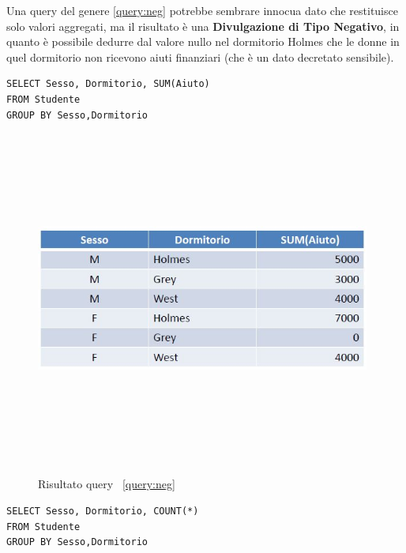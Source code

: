 Una query del genere \ref{query:neg} potrebbe sembrare innocua dato che restituisce solo valori aggregati, ma il risultato è una \textbf{Divulgazione di Tipo Negativo}, in quanto è possibile dedurre dal valore nullo nel dormitorio Holmes che le donne in quel dormitorio non ricevono aiuti finanziari (che è un dato decretato sensibile). 

\begin{algorithm} 
\begin{lstlisting}[caption={Query che implementa un attacco con somma per ottenere Divulgazione di tipo negativo \label{query:neg}}] 
SELECT Sesso, Dormitorio, SUM(Aiuto)
FROM Studente
GROUP BY Sesso,Dormitorio
\end{lstlisting}
\end{algorithm}

\begin{figure}[htbp]
	\centering				
		{\includegraphics[height=11cm, width=11cm, keepaspectratio]{Immagini/dati_sensibili/prot_dati_09.JPG}}
							\caption{Risultato query ~\ref{query:neg} \label{fig:query_indiretta_result}}                         
\end{figure}

\begin{algorithm}
\begin{lstlisting}[caption={Query che implementa un attacco con conteggio \label{query:count}}] 
SELECT Sesso, Dormitorio, COUNT(*)
FROM Studente
GROUP BY Sesso,Dormitorio
\end{lstlisting}
\end{algorithm}

